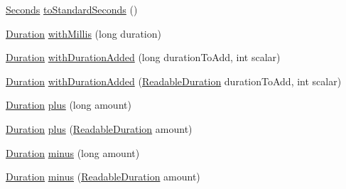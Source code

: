 \begin{DoxyCompactItemize}
\hyperlink{classorg_1_1joda_1_1time_1_1_seconds}{Seconds} \hyperlink{classorg_1_1joda_1_1time_1_1_duration_aa6681673ce51ac039842d1f630877ca0}{to\-Standard\-Seconds} ()
\item 
\hyperlink{classorg_1_1joda_1_1time_1_1_duration}{Duration} \hyperlink{classorg_1_1joda_1_1time_1_1_duration_aaec5860e02321b6c016acb7f49cd1a9a}{with\-Millis} (long duration)
\item 
\hyperlink{classorg_1_1joda_1_1time_1_1_duration}{Duration} \hyperlink{classorg_1_1joda_1_1time_1_1_duration_a26a6be3087329531feca292effe686c5}{with\-Duration\-Added} (long duration\-To\-Add, int scalar)
\item 
\hyperlink{classorg_1_1joda_1_1time_1_1_duration}{Duration} \hyperlink{classorg_1_1joda_1_1time_1_1_duration_a112fe1ffb181c4703add4c49bbe9704c}{with\-Duration\-Added} (\hyperlink{interfaceorg_1_1joda_1_1time_1_1_readable_duration}{Readable\-Duration} duration\-To\-Add, int scalar)
\item 
\hyperlink{classorg_1_1joda_1_1time_1_1_duration}{Duration} \hyperlink{classorg_1_1joda_1_1time_1_1_duration_a5e9b45fb4561cc5297d6a49927c2c2db}{plus} (long amount)
\item 
\hyperlink{classorg_1_1joda_1_1time_1_1_duration}{Duration} \hyperlink{classorg_1_1joda_1_1time_1_1_duration_a2a7983bae59e835c789ce4bef9d5ebb1}{plus} (\hyperlink{interfaceorg_1_1joda_1_1time_1_1_readable_duration}{Readable\-Duration} amount)
\item 
\hyperlink{classorg_1_1joda_1_1time_1_1_duration}{Duration} \hyperlink{classorg_1_1joda_1_1time_1_1_duration_a98120d4b15e271b177b3198d1d2b8830}{minus} (long amount)
\item 
\hyperlink{classorg_1_1joda_1_1time_1_1_duration}{Duration} \hyperlink{classorg_1_1joda_1_1time_1_1_duration_a0eddb489a55ded57742d424384543c23}{minus} (\hyperlink{interfaceorg_1_1joda_1_1time_1_1_readable_duration}{Readable\-Duration} amount)
\end{DoxyCompactItemize}

